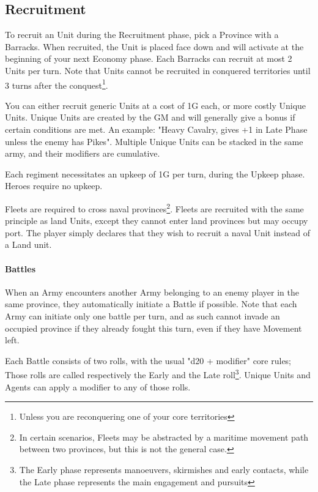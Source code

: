 \subsection{Recruitment}

To recruit an Unit during the Recruitment phase, pick a Province with a Barracks. When recruited, the Unit is placed face down and will activate at the beginning of your next Economy phase. Each Barracks can recruit at most 2 Units per turn. Note that Units cannot be recruited in conquered territories until 3 turns after the conquest\footnote{Unless you are reconquering one of your core territories}.

You can either recruit generic Units at a cost of 1G each, or more costly Unique Units. Unique Units are created by the GM and will generally give a bonus if certain conditions are met. An example: "Heavy Cavalry, gives +1 in Late Phase unless the enemy has Pikes". Multiple Unique Units can be stacked in the same army, and their modifiers are cumulative.

Each regiment necessitates an upkeep of 1G per turn, during the Upkeep phase. 
Heroes require no upkeep. 

Fleets are required to cross naval provinces\footnote{In certain scenarios, Fleets may be abstracted by a maritime movement path between two provinces, but this is not the general case.}. Fleets are recruited with the same principle as land Units, except they cannot enter land provinces but may occupy port. The player simply declares that they wish to recruit a naval Unit instead of a Land unit. 


\paragraph{Battles}

When an Army encounters another Army belonging to an enemy player in the same province, they automatically initiate a Battle if possible. Note that each Army can initiate only one battle per turn, and as such cannot invade an occupied province if they already fought this turn, even if they have Movement left.

Each Battle consists of two rolls, with the usual "d20 + modifier" core rules; Those rolls are called respectively the Early and the Late roll\footnote{The Early phase represents manoeuvers, skirmishes and early contacts, while the Late phase represents the main engagement and pursuits}. Unique Units and Agents can apply a modifier to any of those rolls.

